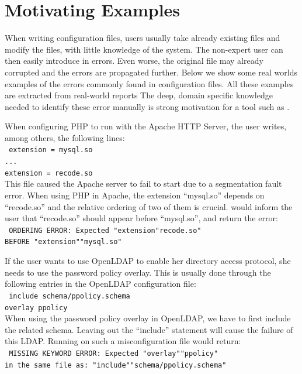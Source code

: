 \section{Motivating Examples}
\label{sec:motiv}

When writing configuration files, users usually take already existing
files and modify the files, with little knowledge of the system. 
The non-expert user can then easily introduce in errors.
Even worse, the original file may already corrupted and the errors are propagated further. 
Below we show some real worlds examples of the errors commonly found in configuration files.
All these examples are extracted from real-world reports %
The deep, domain specific knowledge needed to identify these error manually is strong motivation for a tool such as \app.

When configuring PHP to run with the
Apache HTTP Server, the user writes, among others, the following lines:\\
 \texttt{
 \hspace*{3em}extension = mysql.so\\
 \hspace*{3em}...\\
 \hspace*{3em}extension = recode.so}\\
This file caused the Apache server to fail to start due to a segmentation fault error.
When using PHP in Apache, the extension ``mysql.so'' depends on ``recode.so'' and the relative ordering of two of them is crucial. 
\app would inform the user that ``recode.so'' should appear before ``mysql.so'', and return the error:\\
 \texttt{
ORDERING ERROR: Expected "extension"recode.so"\\
   BEFORE "extension""mysql.so"
  }

If the user wants to use OpenLDAP to enable her directory access
protocol, she needs to use the password policy overlay. This is usually
done through the following entries in the OpenLDAP configuration file:\\
\texttt{
 \hspace*{3em}include schema/ppolicy.schema\\
 \hspace*{3em}overlay ppolicy\\}
When using the password policy overlay in OpenLDAP, we have to first include the related schema.
Leaving out the ``include'' statement will cause the failure of 
this LDAP. Running \app on such a misconfiguration file would return:\\
\texttt{
MISSING KEYWORD ERROR: Expected "overlay""ppolicy"\\ 
in the same file as: "include""schema/ppolicy.schema"}

